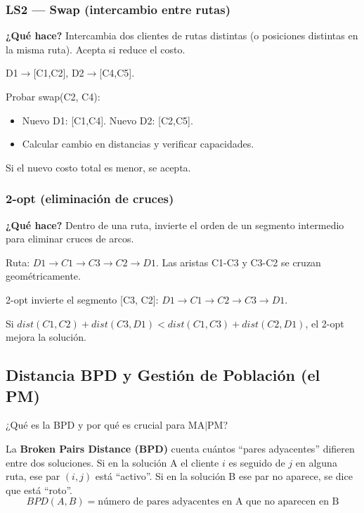 \documentclass[12pt,a4paper]{article}
\begin{document}
\subsubsection{LS2 --- Swap (intercambio entre rutas)}

\textbf{¿Qué hace?} Intercambia dos clientes de rutas distintas (o posiciones distintas en la misma ruta). Acepta si reduce el costo.

\begin{ejemplo}
D1$\to$[C1,C2], D2$\to$[C4,C5].

Probar swap(C2, C4):
\begin{itemize}
\item Nuevo D1: [C1,C4]. Nuevo D2: [C2,C5].
\item Calcular cambio en distancias y verificar capacidades.
\end{itemize}
Si el nuevo costo total es menor, se acepta.
\end{ejemplo}

\subsubsection{2-opt (eliminación de cruces)}

\textbf{¿Qué hace?} Dentro de una ruta, invierte el orden de un segmento intermedio para eliminar cruces de arcos.

\begin{ejemplo}
Ruta: $D1 \to C1 \to C3 \to C2 \to D1$. Las aristas C1-C3 y C3-C2 se cruzan geométricamente.

2-opt invierte el segmento [C3, C2]: $D1 \to C1 \to C2 \to C3 \to D1$.

Si $dist(C1,C2) + dist(C3,D1) < dist(C1,C3) + dist(C2,D1)$, el 2-opt mejora la solución.
\end{ejemplo}

\subsection{Distancia BPD y Gestión de Población (el PM)}

\begin{pregunta}
¿Qué es la BPD y por qué es crucial para MA$|$PM?
\end{pregunta}

\begin{definicion}
La \textbf{Broken Pairs Distance (BPD)} cuenta cuántos ``pares adyacentes'' difieren entre dos soluciones. Si en la solución A el cliente $i$ es seguido de $j$ en alguna ruta, ese par $(i,j)$ está ``activo''. Si en la solución B ese par no aparece, se dice que está ``roto''.
$$BPD(A, B) = \text{número de pares adyacentes en A que no aparecen en B}$$
\end{definicion}
\end{document}
